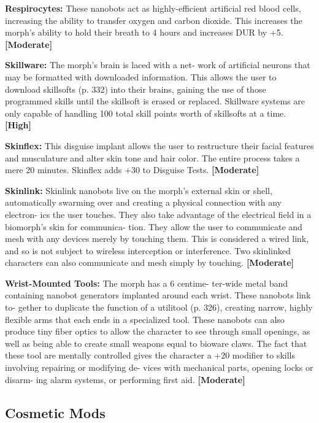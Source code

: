 \textbf{Respirocytes:} These nanobots act as highly-efficient 
artificial red blood cells, increasing the ability to 
transfer oxygen and carbon dioxide. This increases 
the morph's ability to hold their breath to 4 hours 
and increases DUR by +5. \textbf{[Moderate]}

\textbf{Skillware: }The morph's brain is laced with a net-
work of artificial neurons that may be formatted with 
downloaded information. This allows the user to 
download skillsofts (p. 332) into their brains, gaining 
the use of those programmed skills until the skillsoft 
is erased or replaced. Skillware systems are only 
capable of handling 100 total skill points worth of 
skillsofts at a time. \textbf{[High]}

\textbf{Skinflex: }This disguise implant allows the user to 
restructure their facial features and musculature and 
alter skin tone and hair color. The entire process takes 
a mere 20 minutes. Skinflex adds +30 to Disguise 
Tests. \textbf{[Moderate]}

\textbf{Skinlink:} Skinlink nanobots live on the morph's 
external skin or shell, automatically swarming over 
and creating a physical connection with any electron-
ics the user touches. They also take advantage of the 
electrical field in a biomorph's skin for communica-
tion. They allow the user to communicate and mesh 
with any devices merely by touching them. This 
is considered a wired link, and so is not subject to 
wireless interception or interference. Two skinlinked 
characters can also communicate and mesh simply by 
touching. \textbf{[Moderate]}

\textbf{Wrist-Mounted Tools: }The morph has a 6 centime-
ter-wide metal band containing nanobot generators 
implanted around each wrist. These nanobots link to-
gether to duplicate the function of a utilitool (p. 326), 
creating narrow, highly flexible arms that each ends in 
a specialized tool. These nanobots can also produce 
tiny fiber optics to allow the character to see through 
small openings, as well as being able to create small 
weapons equal to bioware claws. The fact that these 
tool are mentally controlled gives the character a +20 
modifier to skills involving repairing or modifying de-
vices with mechanical parts, opening locks or disarm-
ing alarm systems, or performing first aid. \textbf{[Moderate]}

\subsection{Cosmetic Mods}

